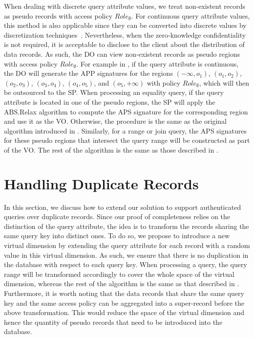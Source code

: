 When dealing with discrete query attribute values, we treat non-existent records as pseudo records with access policy ${Role}_{\emptyset}$. For continuous query attribute values, this method is also applicable since they can be converted into discrete values by discretization techniques~\cite{Kotsiantis2006}. Nevertheless, when the zero-knowledge confidentiality is not required, it is acceptable to disclose to the client about the distribution of data records. As such, the DO can view non-existent records as pseudo regions with access policy ${Role}_{\emptyset}$. For example in , if the query attribute is continuous, the DO will generate the APP signatures for the regions $(-\infty,o_1)$, $(o_1, o_2)$, $(o_2, o_3)$, $(o_3, o_4)$, $(o_4, o_5)$, and $(o_5, +\infty)$ with policy ${Role}_{\emptyset}$, which will then be outsourced to the SP\@. When processing an equality query, if the query attribute is located in one of the pseudo regions, the SP will apply the \textsf{ABS.Relax} algorithm to compute the APS signature for the corresponding region and use it as the VO\@. Otherwise, the procedure is the same as  the original algorithm introduced in . Similarly, for a range or join query, the APS signatures for these pseudo regions that intersect the query range will be constructed as part of the VO\@. The rest of the algorithm is the same as those described in .

\section{Handling Duplicate Records}\label{sec:access-control:dup}

In this section, we discuss how to extend our solution to support authenticated queries over duplicate records. Since our proof of completeness relies on the distinction of the query attribute, the idea is to transform the records sharing the same query key into distinct ones. To do so, we propose to introduce a new virtual dimension by extending the query attribute for each record with a random value in this virtual dimension. As such, we ensure that there is no duplication in the database with respect to each query key.
When processing a query, the query range will be transformed accordingly to cover the whole space of the virtual dimension, whereas the rest of the algorithm is the same as that described in .
Furthermore, it is worth noting that the data records that share the same query key and the same access policy can be aggregated into a super-record before the above transformation. This would reduce the space of the virtual dimension and hence the quantity of pseudo records that need to be introduced into the database.

